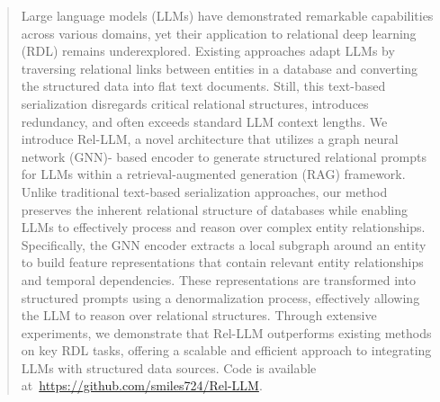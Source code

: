 \documentclass[11pt]{article}
\begin{document}
\begin{abstract}
Large language models (LLMs) have demonstrated remarkable capabilities across various domains, yet their application to relational deep learning (RDL) remains underexplored. Existing approaches adapt LLMs by traversing relational links between entities in a database and converting the structured data into flat text documents. Still, this text-based serialization disregards critical relational structures, introduces redundancy, and often exceeds standard LLM context lengths. We introduce Rel-LLM, a novel architecture that utilizes a graph neural network (GNN)- based encoder to generate structured relational prompts for LLMs within a retrieval-augmented generation (RAG) framework. Unlike traditional text-based serialization approaches, our method preserves the inherent relational structure of databases while enabling LLMs to effectively process and reason over complex entity relationships. 
Specifically, the GNN encoder extracts a local subgraph around an entity to build feature representations that contain relevant entity relationships and temporal dependencies. These representations are transformed into structured prompts using a denormalization process, effectively allowing the LLM to reason over relational structures. Through extensive experiments, we demonstrate that Rel-LLM outperforms existing methods on key RDL tasks, offering a scalable and efficient approach to integrating LLMs with structured data sources. Code is available at~\url{https://github.com/smiles724/Rel-LLM}. 
\end{abstract}
\end{document}
